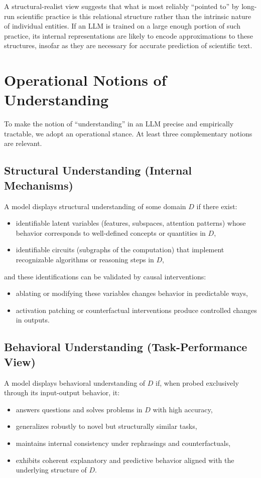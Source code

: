 \documentclass[11pt]{article}
\begin{document}
	A structural-realist view suggests that what is most reliably ``pointed to'' by long-run scientific practice is this relational structure rather than the intrinsic nature of individual entities. If an LLM is trained on a large enough portion of such practice, its internal representations are likely to encode approximations to these structures, insofar as they are necessary for accurate prediction of scientific text.
	
	\section{Operational Notions of Understanding}
	
	To make the notion of ``understanding'' in an LLM precise and empirically tractable, we adopt an operational stance. At least three complementary notions are relevant.
	
	\subsection{Structural Understanding (Internal Mechanisms)}
	
	A model displays structural understanding of some domain $D$ if there exist:
	\begin{itemize}[nosep]
		\item identifiable latent variables (features, subspaces, attention patterns) whose behavior corresponds to well-defined concepts or quantities in $D$,
		\item identifiable circuits (subgraphs of the computation) that implement recognizable algorithms or reasoning steps in $D$,
	\end{itemize}
	and these identifications can be validated by causal interventions:
	\begin{itemize}[nosep]
		\item ablating or modifying these variables changes behavior in predictable ways,
		\item activation patching or counterfactual interventions produce controlled changes in outputs.
	\end{itemize}
	
	\subsection{Behavioral Understanding (Task-Performance View)}
	
	A model displays behavioral understanding of $D$ if, when probed exclusively through its input-output behavior, it:
	\begin{itemize}[nosep]
		\item answers questions and solves problems in $D$ with high accuracy,
		\item generalizes robustly to novel but structurally similar tasks,
		\item maintains internal consistency under rephrasings and counterfactuals,
		\item exhibits coherent explanatory and predictive behavior aligned with the underlying structure of $D$.
	\end{itemize}
	
\end{document}
